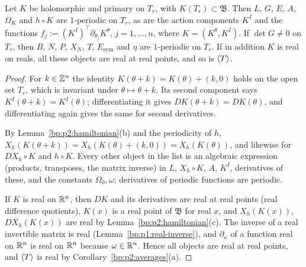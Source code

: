 \begin{lemma}\label{bp:p2:periodicity}
Let $K$ be holomorphic and primary on $T_r$, with $K(T_r)\subset\mathfrak B$. Then $L$, $G$, $E$, $A$,
$\Omega_K$ and $h\circ K$ are $1$-periodic on $T_r$, as are the action components $K^I$ and the functions
$f_j:=(K^I)^\top\partial_{\theta_j}K^\theta$, $j=1,\dots,n$, where $K=(K^\theta,K^I)$. If $\det G\ne0$ on
$T_r$, then $B$, $N$, $P$, $X_N$, $T$, $E_{\mathrm{sym}}$ and $\eta$ are $1$-periodic on $T_r$. If in
addition $K$ is real on reals, all these objects are real at real points, and so is $\langle T\rangle$.
\end{lemma}

\begin{proof}
\label{step:p2:per-dk}
For $k\in\mathbb{Z}^n$ the identity $K(\theta+k)=K(\theta)+(k,0)$ holds on the open set $T_r$, which is
invariant under $\theta\mapsto\theta+k$. Its second component says $K^I(\theta+k)=K^I(\theta)$;
differentiating it gives $DK(\theta+k)=DK(\theta)$, and differentiating again gives the same for second
derivatives.

\label{step:p2:per-compose}
By Lemma~\ref{bp:p2:hamiltonian}(b) and the periodicity of $h$, $X_h(K(\theta+k))=X_h(K(\theta)+(k,0))
=X_h(K(\theta))$, and likewise for $DX_h\circ K$ and $h\circ K$. Every other object in the list is an
algebraic expression (products, transposes, the matrix inverse) in $L$, $X_h\circ K$, $A$, $K^I$,
derivatives of these, and the constants $\Omega_0,\omega$; derivatives of periodic functions are periodic.

\label{step:p2:per-real}
If $K$ is real on $\mathbb{R}^n$, then $DK$ and its derivatives are real at real points (real difference
quotients), $K(x)$ is a real point of $\mathfrak B$ for real $x$, and $X_h(K(x))$, $DX_h(K(x))$ are real
by Lemma~\ref{bp:p2:hamiltonian}(c). The inverse of a real invertible matrix is real
(Lemma~\ref{bp:p1:real-inverse}),
and $\partial_\omega$ of a function real on $\mathbb{R}^n$ is real on $\mathbb{R}^n$ because $\omega\in\mathbb{R}^n$. Hence all
objects are real at real points, and $\langle T\rangle$ is real by Corollary~\ref{bp:p2:averages}(a).
\end{proof}

